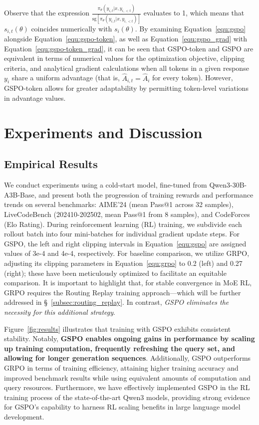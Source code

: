 Observe that the expression $\frac{ \pi_{\theta} (y_{i,t} | x, y_{i,<t}) }{ \mathrm{sg} \left[ \pi_{\theta} (y_{i,t} | x, y_{i,<t}) \right] }$ evaluates to 1, which means that $s_{i,t}(\theta)$ coincides numerically with $s_{i}(\theta)$. By examining Equation~\eqref{equ:gspo} alongside Equation~\eqref{equ:gspo-token}, as well as Equation~\eqref{equ:gspo_grad} with Equation~\eqref{equ:gspo-token_grad}, it can be seen that GSPO-token and GSPO are equivalent in terms of numerical values for the optimization objective, clipping criteria, and analytical gradient calculations when all tokens in a given response $y_i$ share a uniform advantage (that is, $\widehat{A}_{i,t} = \widehat{A}_{i}$ for every token). However, GSPO-token allows for greater adaptability by permitting token-level variations in advantage values.

\section{Experiments and Discussion}

\subsection{Empirical Results}

We conduct experiments using a cold-start model, fine-tuned from Qwen3-30B-A3B-Base, and present both the progression of training rewards and performance trends on several benchmarks: AIME'24 (mean Pass@1 across 32 samples), LiveCodeBench (202410-202502, mean Pass@1 from 8 samples), and CodeForces (Elo Rating). During reinforcement learning (RL) training, we subdivide each rollout batch into four mini-batches for individual gradient update steps. For GSPO, the left and right clipping intervals in Equation~\eqref{equ:gspo} are assigned values of 3e-4 and 4e-4, respectively. For baseline comparison, we utilize GRPO, adjusting its clipping parameters in Equation~\eqref{equ:grpo} to 0.2 (left) and 0.27 (right); these have been meticulously optimized to facilitate an equitable comparison. It is important to highlight that, for stable convergence in MoE RL, GRPO requires the Routing Replay training approach—which will be further addressed in \S~\ref{subsec:routing_replay}. In contrast, \textit{GSPO eliminates the necessity for this additional strategy}.

Figure~\ref{fig:results} illustrates that training with GSPO exhibits consistent stability. Notably, \textbf{GSPO enables ongoing gains in performance by scaling up training computation, frequently refreshing the query set, and allowing for longer generation sequences}. Additionally, GSPO outperforms GRPO in terms of training efficiency, attaining higher training accuracy and improved benchmark results while using equivalent amounts of computation and query resources. Furthermore, we have effectively implemented GSPO in the RL training process of the state-of-the-art Qwen3 models, providing strong evidence for GSPO’s capability to harness RL scaling benefits in large language model development.

